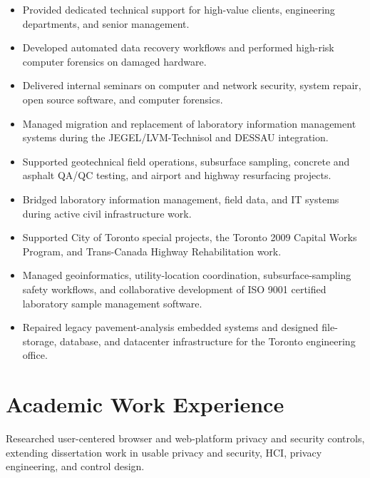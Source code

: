 \documentclass[11pt,letterpaper,sans]{moderncv}        %
\begin{document}
{
\begin{itemize}%
\item Provided dedicated technical support for high-value clients, engineering departments, and senior management.
\item Developed automated data recovery workflows and performed high-risk computer forensics on damaged hardware.
\item Delivered internal seminars on computer and network security, system repair, open source software, and computer forensics.
\end{itemize}}

{
\begin{itemize}%
\item Managed migration and replacement of laboratory information management systems during the JEGEL/LVM-Technisol and DESSAU integration.
\item Supported geotechnical field operations, subsurface sampling, concrete and asphalt QA/QC testing, and airport and highway resurfacing projects.
\item Bridged laboratory information management, field data, and IT systems during active civil infrastructure work.
\end{itemize}}

{
\begin{itemize}%
\item Supported City of Toronto special projects, the Toronto 2009 Capital Works Program, and Trans-Canada Highway Rehabilitation work.
\item Managed geoinformatics, utility-location coordination, subsurface-sampling safety workflows, and collaborative development of ISO 9001 certified laboratory sample management software.
\item Repaired legacy pavement-analysis embedded systems and designed file-storage, database, and datacenter infrastructure for the Toronto engineering office.
\end{itemize}}

\section{Academic Work Experience}
{Researched user-centered browser and web-platform privacy and security controls, extending dissertation work in usable privacy and security, HCI, privacy engineering, and control design.}
\end{document}
